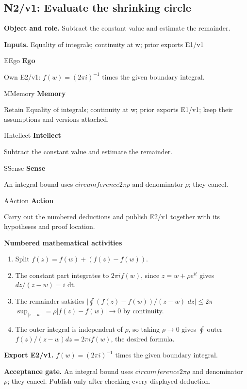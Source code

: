 \documentclass[preprint,12pt,aps,pra,showkeys,amsmath,amssymb,superscriptaddress,floatfix]{revtex4-2}
\theoremstyle{definition}
\theoremstyle{remark}
\newcommand{\mmfaculty}[3]{%
 \begin{mmfacultybox}{#1}{#2}
 {\sffamily\bfseries\color{MMBlue}#2}\par\smallskip #3
 \end{mmfacultybox}}
\newcommand{\field}[2]{\par\smallskip\noindent\textbf{#1.} #2\par}
\begin{document}
\clearpage

\subsection{N2/v1: Evaluate the shrinking circle}

\field{Object and role}{Subtract the constant value and estimate the remainder.}

\field{Inputs}{Equality of integrals; continuity at w; prior exports E1/v1}

\mmfaculty{E}{Ego}{Own E2/v1: \(f(w)=(2\pi i)^{-1}\) times the given boundary integral.}

\mmfaculty{M}{Memory}{Retain Equality of integrals; continuity at w; prior exports E1/v1; keep
their assumptions and versions attached.}

\mmfaculty{I}{Intellect}{Subtract the constant value and estimate the remainder.}

\mmfaculty{S}{Sense}{An integral bound uses \(circumference2\pi \rho\) and denominator
\(\rho\); they cancel.}

\mmfaculty{A}{Action}{Carry out the numbered deductions and publish E2/v1 together with its
hypotheses and proof location.}

\smallskip\noindent\textbf{Numbered mathematical activities}

\begin{enumerate}[label=N2.\arabic*,leftmargin=3.4em]

\item Split \(f(z)=f(w)+(f(z)-f(w))\).

\item The constant part integrates to \(2\pi if(w)\), since
\(z=w+\rho e^{it}\) gives \(dz/(z-w)=i\) dt.

\item The remainder satisfies \(|\oint (f(z)-f(w))/(z-w)\) \(dz|\le 2\pi\)
\(\operatorname{sup} _|z-w|=\rho |f(z)-f(w)|\to 0\) by continuity.

\item The outer integral is independent of \(\rho\), so taking \(\rho \to 0\)
gives \(\oint \operatorname{outer}\) \(f(z)/(z-w)dz=2\pi if(w)\), the
desired formula.

\end{enumerate}

\field{Export E2/v1}{\(f(w)=(2\pi i)^{-1}\) times the given boundary integral.}

\field{Acceptance gate}{An integral bound uses \(circumference2\pi \rho\) and denominator
\(\rho\); they cancel. Publish only after checking every displayed
deduction.}
\end{document}
